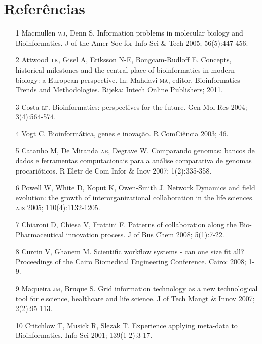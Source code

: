 \documentclass{article}
\begin{document}
\section*{Referências}
\begin{itemize}

\item[1] Macmullen \textsc{wj}, Denn S. Information problems in molecular biology and
Bioinformatics. J of the Amer Soc for Info Sci \& Tech 2005; 56(5):447-456.

\item[2] Attwood \textsc{tk}, Gisel A, Eriksson N-E, Bongcam-Rudloff E. Concepts,
historical milestones and the central place of bioinformatics in modern biology:
a European perspective. In: Mahdavi \textsc{ma}, editor. Bioinformatics-Trends and
Methodologies. Rijeka: Intech Online Publishers; 2011.

\item[3] Costa \textsc{lf}. Bioinformatics: perspectives for the future. Gen Mol Res
2004; 3(4):564-574.

\item[4] Vogt C. Bioinformática, genes e inovação. R ComCiência 2003; 46.

\item[5] Catanho M, De Miranda \textsc{ab}, Degrave W. Comparando genomas: bancos de
dados e ferramentas computacionais para a análise comparativa de genomas
procarióticos. R Eletr de Com Infor \& Inov 2007; 1(2):335-358.

\item[6] Powell W, White D, Koput K, Owen-Smith J. Network Dynamics and field
evolution: the growth of interorganizational collaboration in the life sciences.
\textsc{ajs} 2005; 110(4):1132-1205.

\item[7] Chiaroni D, Chiesa V, Frattini F. Patterns of collaboration along
the Bio-Pharmaceutical innovation process. J of Bus Chem 2008; 5(1):7-22.

\item[8] Curcin V, Ghanem M. Scientific workflow systems - can one size fit
all? Proceedings of the Cairo Biomedical Engineering Conference. Cairo: 2008;
1-9.

\item[9] Maqueira \textsc{jm}, Bruque S. Grid information technology as a new
technological tool for e.science, healthcare and life science. J of Tech Mangt
\& Innov 2007; 2(2):95-113.

\item[10] Critchlow T, Musick R, Slezak T. Experience applying meta-data to
Bioinformatics. Info Sci 2001; 139(1-2):3-17.


\end{itemize}
\end{document}
